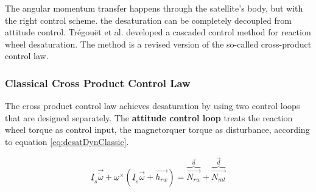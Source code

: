 The angular momentum transfer happens through the satellite's body, but with the right control scheme. the desaturation can be  completely decoupled from attitude control. Trégouët et al. \cite{DesatTregouet} developed a cascaded control method for reaction wheel desaturation. The method is a revised version of the so-called cross-product control law. 
%
%
%
%


\subsubsection{Classical Cross Product Control Law}

The cross product control law achieves desaturation by using two control loops that are designed separately. The \textbf{attitude control loop} treats the reaction wheel torque as control input, the magnetorquer torque as disturbance, according to equation \ref{eq:desatDynClassic}.

\begin{equation}
\underline I_{s} \vec{\dot{\omega}} + \underline{\omega}^\times(\underline I_{s} \vec{\omega} + \vec{h_{rw}})  =    \overbrace{ \vec{N_{rw}}}^{\vec{u}} +  \overbrace{\vec{N_{mt}}}^{\vec{d}}
\label{eq:desatDynClassic}
\end{equation}



